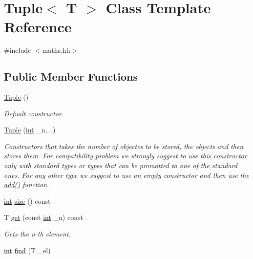 \hypertarget{class_tuple}{}\section{Tuple$<$ T $>$ Class Template Reference}
\label{class_tuple}


{\ttfamily \#include $<$maths.\+hh$>$}

\subsection*{Public Member Functions}
\begin{DoxyCompactItemize}
\item 
\mbox{\hyperlink{class_tuple_ae8bde0e2215d6d5235a2a45195f7bfae}{Tuple}} ()
\begin{DoxyCompactList}\small\item\em Defualt constructor. \end{DoxyCompactList}\item 
\mbox{\hyperlink{class_tuple_af64f6017bf08af095addedf084863f22}{Tuple}} (\mbox{\hyperlink{draw_8hh_aa620a13339ac3a1177c86edc549fda9b}{int}} \+\_\+n,...)
\begin{DoxyCompactList}\small\item\em Constructors that takes the number of objectes to be stored, the objects and then stores them. For compatibility problem we strongly suggest to use this constructor only with standard types or types that can be promotted to one of the standard ones. For any other type we suggest to use an empty constructor and then use the {\ttfamily \mbox{\hyperlink{class_tuple_a5d3ee2809d790543195a6e2075aef7d0}{add()}}} function. \end{DoxyCompactList}\item 
\mbox{\hyperlink{draw_8hh_aa620a13339ac3a1177c86edc549fda9b}{int}} \mbox{\hyperlink{class_tuple_a8fffdb4c6d86d10fcf4aee1b0261e4ba}{size}} () const
\item 
T \mbox{\hyperlink{class_tuple_aabf82c5d0f19c9a8f6a8f01d95801162}{get}} (const \mbox{\hyperlink{draw_8hh_aa620a13339ac3a1177c86edc549fda9b}{int}} \+\_\+n) const
\begin{DoxyCompactList}\small\item\em Gets the n-\/th element. \end{DoxyCompactList}\item 
\mbox{\hyperlink{draw_8hh_aa620a13339ac3a1177c86edc549fda9b}{int}} \mbox{\hyperlink{class_tuple_aab743167e9fd750f71add11b1aa48f6b}{find}} (T \+\_\+el)

\end{DoxyCompactItemize}
